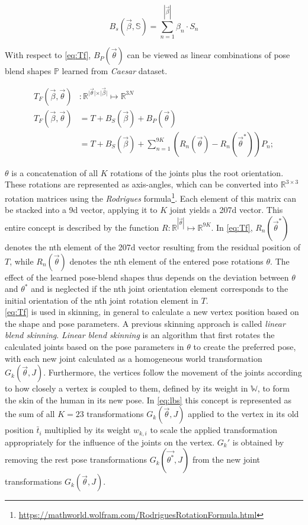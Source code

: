 \begin{equation}
\label{eq:bs}
B_{s}(\vec{\beta},\mathbb{S}) = \sum_{n=1}^{|\vec{\beta}|}\beta_{n} \cdot S_{n}
\end{equation}

With respect to \autoref{eq:Tf}, $B_{P}(\vec{\theta})$ can be viewed as linear combinations of pose blend shapes $\mathbb{P}$ learned from \emph{Caesar} dataset.

\begin{equation}
\label{eq:Tf}
	\begin{split}
		T_{F}(\vec{\beta},\vec{\theta})&: \mathbb{R}^{\vert \vec{\theta} 			\vert \times \vert \vec{\beta} \vert} \mapsto \mathbb{R}^{3N} \\
		T_{F}(\vec{\beta},\vec{\theta}) &= T + B_{S}(\vec{\beta}) + B_{P}				(\vec{\theta}) \\
		&= T + B_{S}(\vec{\beta}) + \sum_{n=1}^{9K} (R_{n}(\vec{\theta}) - 				R_{n}(\vec{\theta}^{*}))P_{n};
	\end{split}
\end{equation}

$\theta$ is a concatenation of all $K$ rotations of the joints plus the root orientation. These rotations are represented as axis-angles, which can be converted into $\mathbb{R}^{3\times3}$ rotation matrices using the \emph{Rodrigues} formula\footnote{\url{https://mathworld.wolfram.com/RodriguesRotationFormula.html}}. Each element of this matrix can be stacked into a 9d vector, applying it to $K$ joint yields a 207d vector. This entire concept is described by the function 
$R: \mathbb{R}^{|\vec{\theta}|} \mapsto \mathbb{R}^{9K}$. In \autoref{eq:Tf}, $R_{n}(\vec{\theta}^{*})$ denotes the nth element of the 207d vector resulting from the residual position of $T$, while $R_{n}(\vec{\theta})$ denotes the nth element of the entered pose rotations $\theta$. The effect of the learned pose-blend shapes thus depends on the deviation between $\theta$ and $\theta^{*}$ and is neglected if the nth joint orientation element corresponds to the initial orientation of the nth joint rotation element in $T$. \\

\autoref{eq:Tf} is used in skinning, in general to calculate a new vertex position based on the shape and pose parameters. A previous skinning approach is called \emph{linear blend skinning}. \emph{Linear blend skinning} is an algorithm that first rotates the calculated joints based on the pose parameters in $\theta$ to create the preferred pose, with each new joint calculated as a homogeneous world transformation $G_{k}(\vec{\theta},J)$. Furthermore, the vertices follow the movement of the joints according to how closely a vertex is coupled to them, defined by its weight in $\mathbb{W}$, to form the skin of the human in its new pose. In \autoref{eq:lbs} this concept is represented as the sum of all $K = 23$ transformations $G_{k}(\vec{\theta},J)$ applied to the vertex in its old position $\bar{t}_{i}$ multiplied by its weight $w_{k,i}$ to scale the applied transformation appropriately for the influence of the joints on the vertex. $G_{k}'$ is obtained by removing the rest pose transformations $G_{k}(\vec{\theta^{*}},J)$ from the new joint transformations $G_{k}(\vec{\theta},J)$.  

